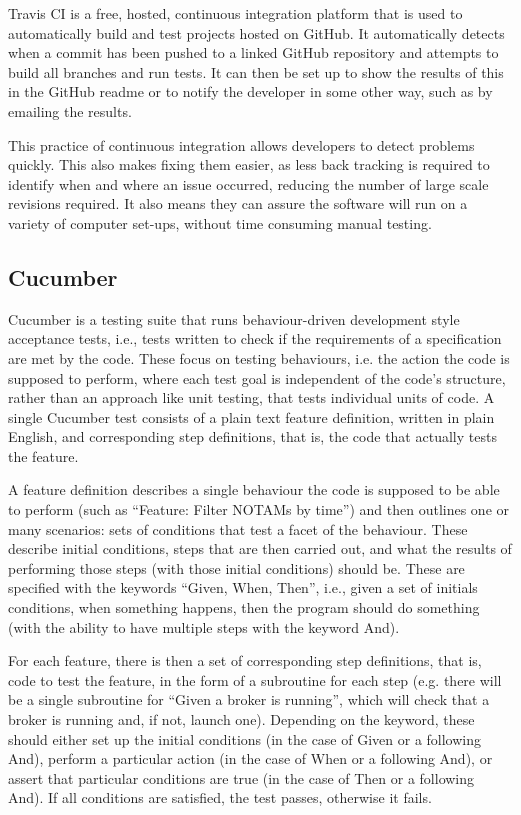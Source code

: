 \documentclass[a4paper, 12pt, twoside]{article}
\begin{document}
Travis CI is a free, hosted, continuous integration platform that is used to automatically build and test projects hosted on GitHub. It automatically detects when a commit has been pushed to a linked GitHub repository and attempts to build all branches and run tests. It can then be set up to show the results of this in the GitHub readme or to notify the developer in some other way, such as by emailing the results.

This practice of continuous integration allows developers to detect problems quickly. This also makes fixing them easier, as less back tracking is required to identify when and where an issue occurred, reducing the number of large scale revisions required. It also means they can assure the software will run on a variety of computer set-ups, without time consuming manual testing.

\subsection{Cucumber}
\label{sec:bg_cucumber}

Cucumber is a testing suite that runs behaviour-driven development style acceptance tests, i.e., tests written to check if the requirements of a specification are met by the code. These focus on testing behaviours, i.e. the action the code is supposed to perform, where each test goal is independent of the code’s structure, rather than an approach like unit testing, that tests individual units of code.
A single Cucumber test consists of a plain text feature definition, written in plain English, and corresponding step definitions, that is, the code that actually tests the feature.

A feature definition describes a single behaviour the code is supposed to be able to perform (such as ``Feature: Filter NOTAMs by time'') and then outlines one or many scenarios: sets of conditions that test a facet of the behaviour. These describe initial conditions, steps that are then carried out, and what the results of performing those steps (with those initial conditions) should be. These are specified with the keywords ``Given, When, Then'', i.e., given a set of initials conditions, when something happens, then the program should do something (with the ability to have multiple steps with the keyword And).

For each feature, there is then a set of corresponding step definitions, that is, code to test the feature, in the form of a subroutine for each step (e.g. there will be a single subroutine for ``Given a broker is running'', which will check that a broker is running and, if not, launch one). Depending on the keyword, these should either set up the initial conditions (in the case of Given or a following And), perform a particular action (in the case of When or a following And), or assert that particular conditions are true (in the case of Then or a following And). If all conditions are satisfied, the test passes, otherwise it fails.
\end{document}
